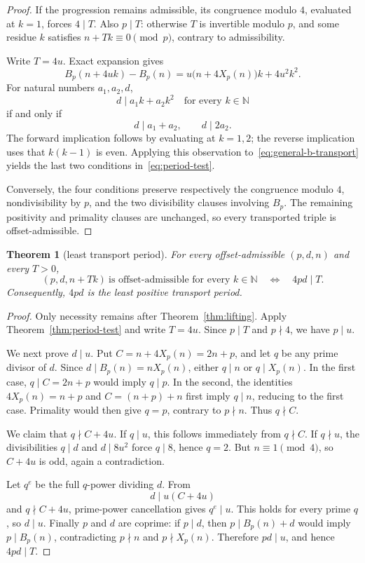 \documentclass[11pt]{article}
\newtheorem{theorem}{Theorem}[section]
\theoremstyle{remark}
\newcommand{\N}{\mathbb{N}}
\begin{document}
\begin{proof}
If the progression remains admissible, its congruence modulo \(4\), evaluated
at \(k=1\), forces \(4\mid T\).  Also \(p\mid T\): otherwise \(T\) is invertible
modulo \(p\), and some residue \(k\) satisfies \(n+Tk\equiv0\pmod p\), contrary
to admissibility.

Write \(T=4u\).  Exact expansion gives
\begin{equation}\label{eq:general-b-transport}
  B_p(n+4uk)-B_p(n)
  =
  u\bigl(n+4X_p(n)\bigr)k+4u^2k^2.
\end{equation}
For natural numbers \(a_1,a_2,d\),
\[
  d\mid a_1k+a_2k^2\quad\text{for every }k\in\N
\]
if and only if
\[
  d\mid a_1+a_2,\qquad d\mid2a_2.
\]
The forward implication follows by evaluating at \(k=1,2\); the reverse
implication uses that \(k(k-1)\) is even.  Applying this observation
to~\eqref{eq:general-b-transport} yields the last two conditions
in~\eqref{eq:period-test}.

Conversely, the four conditions preserve respectively the congruence modulo
\(4\), nondivisibility by \(p\), and the two divisibility clauses involving
\(B_p\).  The remaining positivity and primality clauses are unchanged, so
every transported triple is offset-admissible.
\end{proof}

\begin{theorem}[least transport period]\label{thm:least-period}
For every offset-admissible \((p,d,n)\) and every \(T>0\),
\[
  (p,d,n+Tk)\ \text{is offset-admissible for every }k\in\N
  \quad\Longleftrightarrow\quad
  4pd\mid T.
\]
Consequently, \(4pd\) is the least positive transport period.
\end{theorem}

\begin{proof}
Only necessity remains after Theorem~\ref{thm:lifting}.  Apply
Theorem~\ref{thm:period-test} and write \(T=4u\).  Since \(p\mid T\) and
\(p\nmid4\), we have \(p\mid u\).

We next prove \(d\mid u\).  Put \(C=n+4X_p(n)=2n+p\), and let \(q\) be any
prime divisor of \(d\).  Since \(d\mid B_p(n)=nX_p(n)\), either \(q\mid n\) or
\(q\mid X_p(n)\).  In the first case, \(q\mid C=2n+p\) would imply
\(q\mid p\).  In the second, the identities \(4X_p(n)=n+p\) and
\(C=(n+p)+n\) first imply \(q\mid n\), reducing to the first case.  Primality
would then give \(q=p\), contrary to \(p\nmid n\).  Thus \(q\nmid C\).

We claim that \(q\nmid C+4u\).  If \(q\mid u\), this follows immediately from
\(q\nmid C\).  If \(q\nmid u\), the divisibilities \(q\mid d\) and
\(d\mid8u^2\) force \(q\mid8\), hence \(q=2\).  But \(n\equiv1\pmod4\), so
\(C+4u\) is odd, again a contradiction.

Let \(q^e\) be the full \(q\)-power dividing \(d\).  From
\[
  d\mid u(C+4u)
\]
and \(q\nmid C+4u\), prime-power cancellation gives \(q^e\mid u\).
This holds for every prime \(q\), so \(d\mid u\).  Finally \(p\) and \(d\) are
coprime: if \(p\mid d\), then \(p\mid B_p(n)+d\) would imply
\(p\mid B_p(n)\), contradicting \(p\nmid n\) and \(p\nmid X_p(n)\).
Therefore \(pd\mid u\), and hence \(4pd\mid T\).
\end{proof}
\end{document}
